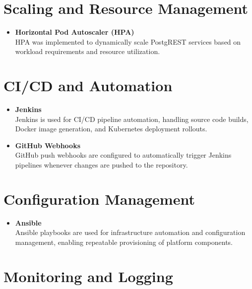 \documentclass[12pt,a4paper]{report}
\begin{document}
\section{Scaling and Resource Management}

\begin{itemize}

    \item \textbf{Horizontal Pod Autoscaler (HPA)} \\
    HPA was implemented to dynamically scale PostgREST services based on workload requirements and resource utilization.

\end{itemize}

\section{CI/CD and Automation}

\begin{itemize}

    \item \textbf{Jenkins} \\
    Jenkins is used for CI/CD pipeline automation, handling source code builds, Docker image generation, and Kubernetes deployment rollouts.

    \item \textbf{GitHub Webhooks} \\
    GitHub push webhooks are configured to automatically trigger Jenkins pipelines whenever changes are pushed to the repository.

\end{itemize}

\section{Configuration Management}

\begin{itemize}

    \item \textbf{Ansible} \\
    Ansible playbooks are used for infrastructure automation and configuration management, enabling repeatable provisioning of platform components.

\end{itemize}

\section{Monitoring and Logging}
\end{document}
